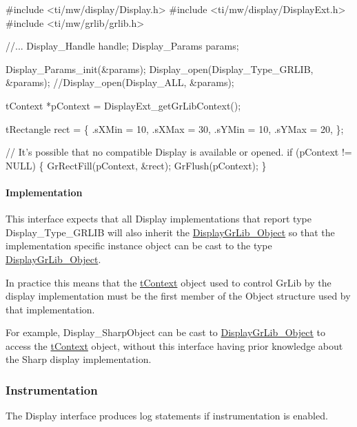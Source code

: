 \begin{DoxyCode}
\textcolor{preprocessor}{#include <ti/mw/display/Display.h>}
\textcolor{preprocessor}{#include <ti/mw/display/DisplayExt.h>}
\textcolor{preprocessor}{#include <ti/mw/grlib/grlib.h>}

\textcolor{comment}{//...}
Display_Handle    handle;
Display_Params    params;

Display_Params_init(&params);
Display_open(Display_Type_GRLIB, &params);
\textcolor{comment}{//Display\_open(Display\_ALL, &params);}

tContext *pContext = DisplayExt\_getGrLibContext();

tRectangle rect = \{
    .sXMin = 10,
    .sXMax = 30,
    .sYMin = 10,
    .sYMax = 20,
\};

\textcolor{comment}{// It's possible that no compatible Display is available or opened.}
\textcolor{keywordflow}{if} (pContext != NULL)
\{
    GrRectFill(pContext, &rect);
    GrFlush(pContext);
\}
\end{DoxyCode}


\paragraph*{Implementation}

This interface expects that all Display implementations that report type Display\+\_\+\+Type\+\_\+\+G\+R\+L\+I\+B will also \textquotesingle{}inherit\textquotesingle{} the \hyperlink{struct_display_gr_lib___object}{Display\+Gr\+Lib\+\_\+\+Object} so that the implementation specific instance object can be cast to the type \hyperlink{struct_display_gr_lib___object}{Display\+Gr\+Lib\+\_\+\+Object}.

In practice this means that the \hyperlink{structt_context}{t\+Context} object used to control Gr\+Lib by the display implementation must be the first member of the Object structure used by that implementation.

For example, Display\+\_\+\+Sharp\+Object can be cast to \hyperlink{struct_display_gr_lib___object}{Display\+Gr\+Lib\+\_\+\+Object} to access the \hyperlink{structt_context}{t\+Context} object, without this interface having prior knowledge about the Sharp display implementation.

\subsubsection*{Instrumentation}

The Display interface produces log statements if instrumentation is enabled.

